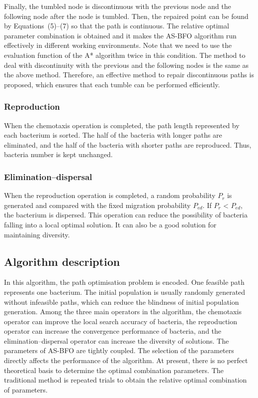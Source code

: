 \documentclass{PDS}%
\theoremstyle{definition}
\begin{document}
Finally, the tumbled node is discontinuous with the previous node and the following node after
the node is tumbled. Then, the repaired point can be found by
Equations~(5)--(7) so that the path is continuous. The relative optimal parameter combination is obtained and it makes the AS-BFO algorithm
run effectively in different working environments. Note that we need
to use the evaluation function of the A* algorithm twice in this condition.
The method to deal with discontinuity with the previous and the following nodes is the
same as the above method. Therefore, an effective method to repair discontinuous paths is
proposed, which ensures that each tumble can be performed efficiently.


\subsubsection{Reproduction}

When the chemotaxis operation is completed, the path length represented by each bacterium
is sorted. The half of the bacteria with longer paths are eliminated, and the half of the bacteria
with shorter paths are reproduced. Thus, bacteria number is kept unchanged.

\subsubsection{Elimination--dispersal}

When the reproduction operation is completed, a random probability $P_r$ is generated and
compared with the fixed migration probability $P_{ed}$. If $P_r$ < $P_{ed}$, the
bacterium is dispersed. This operation can reduce the possibility of bacteria falling
into a local optimal solution. It can also be a good solution for maintaining diversity.

\subsection{Algorithm description}

In this algorithm, the path optimisation problem is encoded. One feasible path
represents one bacterium. The initial population is usually randomly generated without
infeasible paths, which can reduce the blindness of initial population generation. Among
the three main operators in the algorithm, the chemotaxis operator can improve the local
search accuracy of bacteria, the reproduction operator can increase the convergence
performance of bacteria, and the elimination--dispersal operator can increase the diversity of
solutions. The parameters of AS-BFO are tightly coupled. The selection of the parameters
directly affects the performance of the algorithm. At present, there is no perfect
theoretical basis to determine the optimal combination parameters. The traditional method
is repeated trials to obtain the relative optimal combination of parameters.
\end{document}
